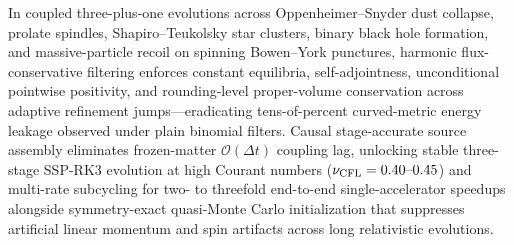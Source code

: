 In coupled three-plus-one evolutions across Oppenheimer--Snyder dust collapse, prolate spindles, Shapiro--Teukolsky star clusters, binary black hole formation, and massive-particle recoil on spinning Bowen--York punctures, harmonic flux-conservative filtering enforces constant equilibria, self-adjointness, unconditional pointwise positivity, and rounding-level proper-volume conservation across adaptive refinement jumps—eradicating tens-of-percent curved-metric energy leakage observed under plain binomial filters. Causal stage-accurate source assembly eliminates frozen-matter $\mathcal{O}(\Delta t)$ coupling lag, unlocking stable three-stage SSP-RK3 evolution at high Courant numbers ($\nu_{\rm CFL} = 0.40\text{--}0.45$) and multi-rate subcycling for two- to threefold end-to-end single-accelerator speedups alongside symmetry-exact quasi-Monte Carlo initialization that suppresses artificial linear momentum and spin artifacts across long relativistic evolutions.
